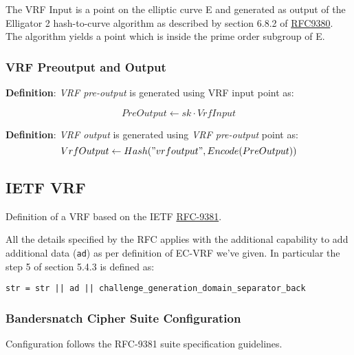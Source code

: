 \documentclass[
]{article}
\begin{document}
The VRF Input is a point on the elliptic curve E and generated as output
of the Elligator 2 hash-to-curve algorithm as described by section 6.8.2
of \href{https://datatracker.ietf.org/doc/rfc9380/}{RFC9380}. The
algorithm yields a point which is inside the prime order subgroup of E.

\hypertarget{vrf-preoutput-and-output}{%
\subsubsection{VRF Preoutput and
Output}\label{vrf-preoutput-and-output}}

\textbf{Definition}: \emph{VRF pre-output} is generated using VRF input
point as:

\[ PreOutput \leftarrow sk \cdot VrfInput \]

\textbf{Definition}: \emph{VRF output} is generated using \emph{VRF
pre-output} point as:
\[ VrfOutput \leftarrow Hash("vrfoutput", Encode(PreOutput)) \]

\hypertarget{ietf-vrf}{%
\subsection{IETF VRF}\label{ietf-vrf}}

Definition of a VRF based on the IETF
\href{https://www.rfc-editor.org/rfc/rfc9381}{RFC-9381}.

All the details specified by the RFC applies with the additional
capability to add additional data (\texttt{ad}) as per definition of
EC-VRF we've given. In particular the step 5 of section 5.4.3 is defined
as:

\begin{verbatim}
str = str || ad || challenge_generation_domain_separator_back
\end{verbatim}

\hypertarget{bandersnatch-cipher-suite-configuration}{%
\subsubsection{Bandersnatch Cipher Suite
Configuration}\label{bandersnatch-cipher-suite-configuration}}

Configuration follows the RFC-9381 suite specification guidelines.
\end{document}
